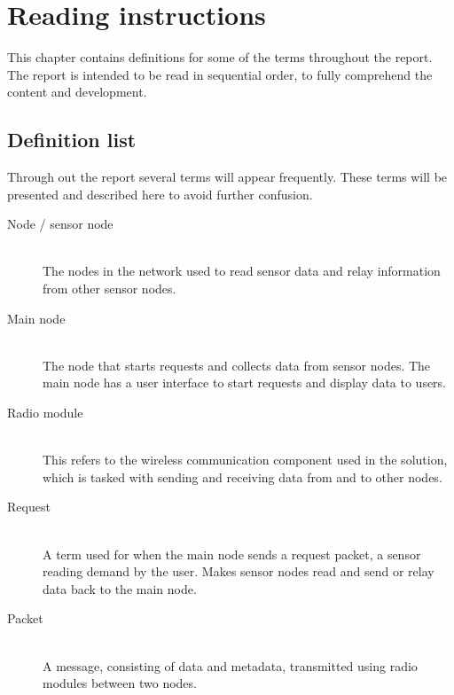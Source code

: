 \chapter{Reading instructions}
This chapter contains definitions for some of the terms throughout the report. The report is intended to be read in sequential order, to fully comprehend the content and development.

\section*{Definition list}
Through out the report several terms will appear frequently. These terms will be presented and described here to avoid further confusion. 

\begin{description}

\item[Node / sensor node] \hfill \\
The nodes in the network used to read sensor data and relay information from other sensor nodes.

\item[Main node] \hfill \\
The node that starts requests and collects data from sensor nodes. The main node has a user interface to start requests and display data to users.

\item[Radio module] \hfill \\
This refers to the wireless communication component used in the solution, which is tasked with sending and receiving data from and to other nodes.

\item[Request] \hfill \\
A term used for when the main node sends a request packet, a sensor reading demand by the user. Makes sensor nodes read and send or relay data back to the main node.

\item[Packet] \hfill \\
A message, consisting of data and metadata, transmitted using radio modules between two nodes.

\end{description}

